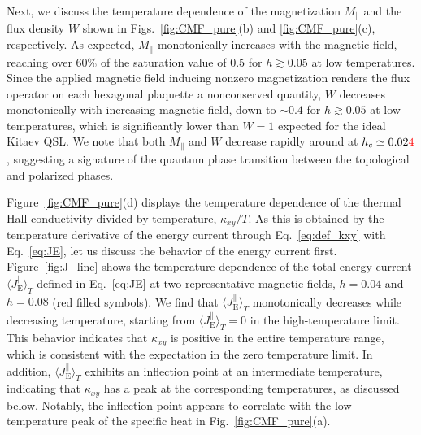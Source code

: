 \documentclass[twocolumn,superscriptaddress,showpacs, longbibliography, aps, prx]{revtex4-2}
\newcommand{\red}[1]{\textcolor{red}{#1}}
\begin{document}
Next, we discuss the temperature dependence of the magnetization $M_\parallel$ and the flux density $W$ shown in Figs.~\ref{fig:CMF_pure}(b) and \ref{fig:CMF_pure}(c), respectively. 
As expected, $M_\parallel$ monotonically increases with the magnetic field, reaching over 60\% of the saturation value of $0.5$ for $h\gtrsim 0.05$ at low temperatures. 
Since the applied magnetic field inducing nonzero magnetization renders the flux operator on each hexagonal plaquette a nonconserved quantity, $W$ decreases monotonically with increasing magnetic field, down to $\sim 0.4$ for $h\gtrsim 0.05$ at low temperatures, which is significantly lower than $W=1$ expected for the ideal Kitaev QSL.
We note that both $M_{\parallel}$ and $W$ decrease rapidly around at $h_c \simeq 0.02\red{4}$, suggesting a signature of the quantum phase transition between the topological and polarized phases. 

Figure~\ref{fig:CMF_pure}(d) displays the temperature dependence of the thermal Hall conductivity divided by temperature, $\kappa_{xy}/T$. 
As this is obtained by the temperature derivative of the energy current through Eq.~\eqref{eq:def_kxy} with Eq.~\eqref{eq:JE}, let us discuss the behavior of the energy current first. 
Figure~\ref{fig:J_line} shows the temperature dependence of the total energy current $\langle J_{\mathrm{E}}^\parallel \rangle_T$ defined in Eq.~\eqref{eq:JE} at two representative magnetic fields, $h=0.04$ and $h=0.08$ (red filled symbols). 
We find that $\langle J_{\mathrm{E}}^\parallel \rangle_T$ monotonically decreases while decreasing temperature, starting from $\langle J_{\mathrm{E}}^{\parallel} \rangle_T =0$ in the high-temperature limit. This behavior indicates that $\kappa_{xy}$ is positive in the entire temperature range, which is consistent with the expectation in the zero temperature limit. 
In addition, $\langle J_{\mathrm{E}}^\parallel \rangle_T$ exhibits an inflection point at an intermediate temperature, indicating that $\kappa_{xy}$ has a peak at the corresponding temperatures, as discussed below. 
Notably, the inflection point appears to correlate with the low-temperature peak of the specific heat in Fig.~\ref{fig:CMF_pure}(a). 
\end{document}
